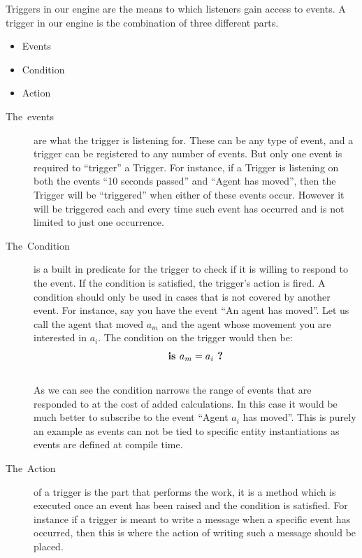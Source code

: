 Triggers in our engine are the means to which listeners gain access
to events. A trigger in our engine is the combination of three different
parts.
\begin{itemize}
\item Events
\item Condition
\item Action\end{itemize}
\begin{description}
\item [{The~events}] are what the trigger is listening for. These can
be any type of event, and a trigger can be registered to any number
of events. But only one event is required to \textquotedblleft{}trigger\textquotedblright{}
a Trigger. For instance, if a Trigger is listening on both the events
\textquotedblleft{}10 seconds passed\textquotedblright{} and \textquotedblleft{}Agent
has moved\textquotedblright{}, then the Trigger will be \textquotedblleft{}triggered\textquotedblright{}
when either of these events occur. However it will be triggered each
and every time such event has occurred and is not limited to just
one occurrence.
\item [{The~Condition}] is a built in predicate for the trigger to check
if it is willing to respond to the event. If the condition is satisfied,
the trigger\textquoteright{}s action is fired. A condition should
only be used in cases that is not covered by another event. For instance,
say you have the event \textquotedblleft{}An agent has moved\textquotedblright{}.
Let us call the agent that moved $a_{m}$ and the agent whose movement
you are interested in $a_{i}$. The condition on the trigger would
then be: 
\[
\textrm{\textbf{is }}a_{m}=a_{i}\textbf{ ?}
\]
\\
As we can see the condition narrows the range of events that are responded
to at the cost of added calculations. In this case it would be much
better to subscribe to the event \textquotedblleft{}Agent $a_{i}$
has moved\textquotedblright{}. This is purely an example as events
can not be tied to specific entity instantiations as events are defined
at compile time.
\item [{The~Action}] of a trigger is the part that performs the work,
it is a method which is executed once an event has been raised and
the condition is satisfied. For instance if a trigger is meant to
write a message when a specific event has occurred, then this is where
the action of writing such a message should be placed.
\end{description}

